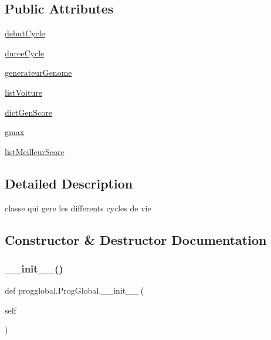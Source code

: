 \subsection*{Public Attributes}
\begin{DoxyCompactItemize}
\item 
\hyperlink{classprogglobal_1_1_prog_global_a52056202bd9de0d78b035856ae42acd8}{debut\+Cycle}
\item 
\hyperlink{classprogglobal_1_1_prog_global_a278ea388fbcadc587c2ad39739903589}{duree\+Cycle}
\item 
\hyperlink{classprogglobal_1_1_prog_global_a7a820f681681623cdf9aff6719cc8c9c}{generateur\+Genome}
\item 
\hyperlink{classprogglobal_1_1_prog_global_a03645d0d3088e80681fcdff58ef2cdfa}{list\+Voiture}
\item 
\hyperlink{classprogglobal_1_1_prog_global_a460adbea5baa5eb525c4270d576b26a1}{dict\+Gen\+Score}
\item 
\hyperlink{classprogglobal_1_1_prog_global_ac533b1088bac8814c0baa0fc7d03f483}{gmax}
\item 
\hyperlink{classprogglobal_1_1_prog_global_a8158d8bc02445a2d5e62aba87d61e721}{list\+Meilleur\+Score}
\end{DoxyCompactItemize}


\subsection{Detailed Description}
classe qui gere les differents cycles de vie 

\subsection{Constructor \& Destructor Documentation}
\mbox{\label{classprogglobal_1_1_prog_global_a58f0d1e91fb19db93259697d6c28fb92}} 
\subsubsection{\texorpdfstring{\+\_\+\+\_\+init\+\_\+\+\_\+()}{\_\_init\_\_()}}
{\footnotesize\ttfamily def progglobal.\+Prog\+Global.\+\_\+\+\_\+init\+\_\+\+\_\+ (\begin{DoxyParamCaption}\item[{}]{self }\end{DoxyParamCaption})}



